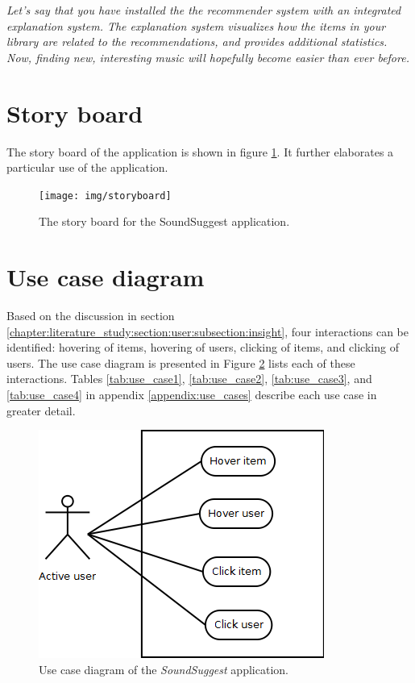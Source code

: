 \textit{Let's say that you have installed the the recommender system with an integrated explanation system. The explanation system visualizes how the items in your library are related to the recommendations, and provides additional statistics. Now, finding new, interesting music will hopefully become easier than ever before.}


\section{Story board}

The story board of the application is shown in figure \ref{figure:storyboard}. It further elaborates a particular use of the application.

\begin{figure}
  \begin{center}
  \texttt{[image: img/storyboard]}
	\end{center}
  \caption{The story board for the SoundSuggest application.}
  \label{figure:storyboard}
\end{figure}




\section{Use case diagram}

Based on the discussion in section \ref{chapter:literature_study:section:user:subsection:insight}, four interactions can be identified: hovering of items, hovering of users, clicking of items, and clicking of users. The use case diagram is presented in Figure \ref{fig:use_case_diagram} lists each of these interactions. Tables \ref{tab:use_case1}, \ref{tab:use_case2}, \ref{tab:use_case3}, and \ref{tab:use_case4} in appendix \ref{appendix:use_cases} describe each use case in greater detail.

\begin{figure}
  \begin{center}
  \includegraphics[scale=0.7]{img/usecase_diagram}
	\end{center}
  \caption{Use case diagram of the \emph{SoundSuggest} application.}
  \label{fig:use_case_diagram}
\end{figure}






